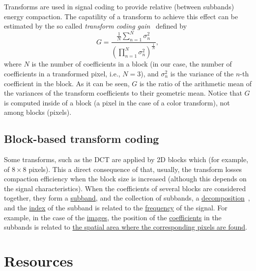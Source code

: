Transforms are used in signal coding to provide relative (between
subbands) energy compaction. The capatility of a transform to achieve
this effect can be estimated by the so called \emph{transform coding
gain}~\cite{vetterli1995wavelets,sayood2017introduction} defined by
\begin{equation}
G = \frac{\frac{1}{N}\sum_{n=1}^N{\sigma_n^2}}{(\prod_{n=1}^N\sigma_n^2)^{\frac{1}{N}}},
\end{equation}
where $N$ is the number of coefficients in a block (in our case, the
number of coefficients in a transformed pixel, i.e., $N=3$), and
$\sigma_n^2$ is the variance of the $n$-th coefficient in the
block. As it can be seen, $G$ is the ratio of the arithmetic mean of
the variances of the transform coefficients to their geometric
mean. Notice that $G$ is computed inside of a block (a pixel in the
case of a color transform), not among blocks (pixels).


\subsection{Block-based transform coding}

Some transforms, such as the DCT are applied by 2D blocks which (for
example, of $8\times 8$ pixels). This a direct consequence of that,
usually, the transform losses compaction efficiency when the block size is
increased (although this depends on the signal characteristics). When
the coefficients of several blocks are considered together, they form
a \href{https://en.wikipedia.org/wiki/Sub-band_coding}{subband}, and
the collection of subbands, a
\href{https://en.wikipedia.org/wiki/Discrete_wavelet_transform}{decomposition}~\cite{vetterli2014foundations},
and the
\href{https://en.wikipedia.org/wiki/Array_data_structure#Element_identifier_and_addressing_formulas}{index}
of the subband is related to the
\href{https://en.wikipedia.org/wiki/Frequency}{frequency} of the
signal. For example, in the case of the
\href{https://en.wikipedia.org/wiki/Digital_image}{images}, the
position of the
\href{https://en.wikipedia.org/wiki/Coefficient}{coefficients} in the
subbands is related to
\href{https://github.com/Sistemas-Multimedia/Sistemas-Multimedia.github.io/blob/master/milestones/07-DCT/block_DCT_compression.ipynb}{the
  spatial area where the corresponding pixels are found}.



\section{Resources}


